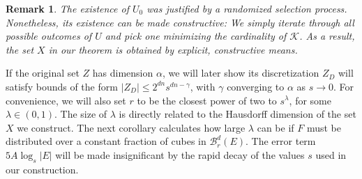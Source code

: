 \documentclass[usenames,dvipsnames]{article}
\theoremstyle{plain}
\theoremstyle{plain}
\newtheorem*{remark}{Remark}
\begin{document}
\begin{remark}
	The existence of $U_0$ was justified by a randomized selection process. Nonetheless, its existence can be made constructive: We simply iterate through all possible outcomes of $U$ and pick one minimizing the cardinality of $\mathcal{K}$. As a result, the set $X$ in our theorem is obtained by explicit, constructive means.
\end{remark}

If the original set $Z$ has dimension $\alpha$, we will later show its discretization $Z_D$ will satisfy bounds of the form $|Z_D| \leq 2^{dn} s^{dn-\gamma}$, with $\gamma$ converging to $\alpha$ as $s \to 0$. For convenience, we will also set $r$ to be the closest power of two to $s^\lambda$, for some $\lambda \in (0,1)$. The size of $\lambda$ is directly related to the Hausdorff dimension of the set $X$ we construct. The next corollary calculates how large $\lambda$ can be if $F$ must be distributed over a constant fraction of cubes in $\mathcal{B}^d_r(E)$. The error term $5A \log_s |E|$ will be made insignificant by the rapid decay of the values $s$ used in our construction.
\end{document}
